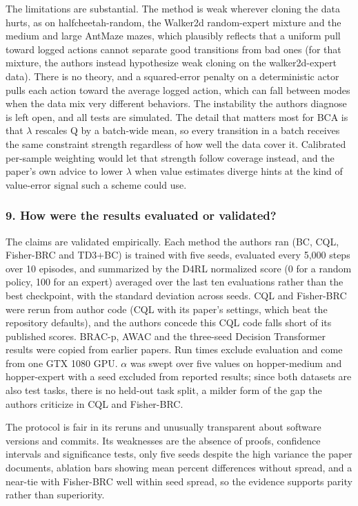 \documentclass[11pt]{article}
\newcommand{\question}[1]{\subsubsection*{#1}}
\begin{document}
The limitations are substantial. The method is weak wherever cloning the data hurts, as on halfcheetah-random, the Walker2d random-expert mixture and the medium and large AntMaze mazes, which plausibly reflects that a uniform pull toward logged actions cannot separate good transitions from bad ones (for that mixture, the authors instead hypothesize weak cloning on the walker2d-expert data). There is no theory, and a squared-error penalty on a deterministic actor pulls each action toward the average logged action, which can fall between modes when the data mix very different behaviors. The instability the authors diagnose is left open, and all tests are simulated. The detail that matters most for BCA is that \ensuremath{\lambda} rescales Q by a batch-wide mean, so every transition in a batch receives the same constraint strength regardless of how well the data cover it. Calibrated per-sample weighting would let that strength follow coverage instead, and the paper's own advice to lower \ensuremath{\lambda} when value estimates diverge hints at the kind of value-error signal such a scheme could use.

\question{9. How were the results evaluated or validated?}

The claims are validated empirically. Each method the authors ran (BC, CQL, Fisher-BRC and TD3+BC) is trained with five seeds, evaluated every 5,000 steps over 10 episodes, and summarized by the D4RL normalized score (0 for a random policy, 100 for an expert) averaged over the last ten evaluations rather than the best checkpoint, with the standard deviation across seeds. CQL and Fisher-BRC were rerun from author code (CQL with its paper's settings, which beat the repository defaults), and the authors concede this CQL code falls short of its published scores. BRAC-p, AWAC and the three-seed Decision Transformer results were copied from earlier papers. Run times exclude evaluation and come from one GTX 1080 GPU. \ensuremath{\alpha} was swept over five values on hopper-medium and hopper-expert with a seed excluded from reported results; since both datasets are also test tasks, there is no held-out task split, a milder form of the gap the authors criticize in CQL and Fisher-BRC.

The protocol is fair in its reruns and unusually transparent about software versions and commits. Its weaknesses are the absence of proofs, confidence intervals and significance tests, only five seeds despite the high variance the paper documents, ablation bars showing mean percent differences without spread, and a near-tie with Fisher-BRC well within seed spread, so the evidence supports parity rather than superiority.
\end{document}
